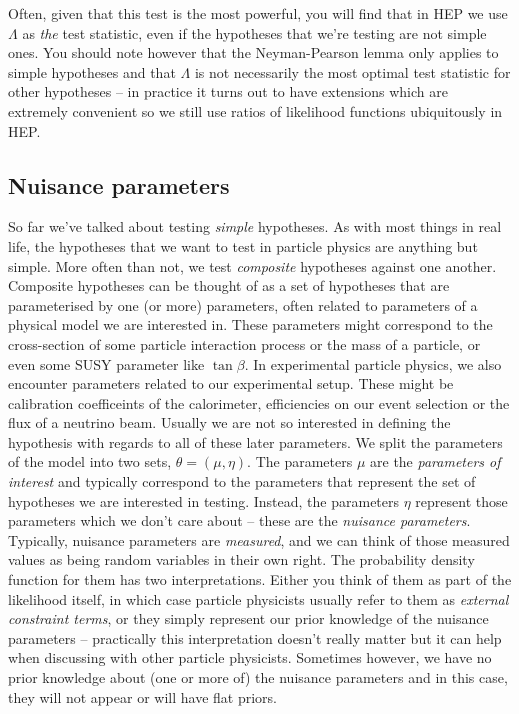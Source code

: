 Often, given that this test is the most powerful, you will find that in HEP we use $\Lambda$ as \emph{the} test statistic, even if the hypotheses that we're testing are not simple ones. You should note however that the Neyman-Pearson lemma only applies to simple hypotheses and that $\Lambda$ is not necessarily the most optimal test statistic for other hypotheses -- in practice it turns out to have extensions which are extremely convenient so we still use ratios of likelihood functions ubiquitously in HEP. 


\subsection{Nuisance parameters}
So far we've talked about testing \emph{simple} hypotheses. As with most things in real life, the hypotheses that we want to test in particle physics are anything but simple. More often than not, we test \emph{composite} hypotheses against one another. Composite hypotheses can be thought of as a set of hypotheses that are parameterised by one (or more) parameters, often related to parameters of a physical model we are interested in. These parameters might correspond to the cross-section of some particle interaction process or the mass of a particle, or even some SUSY parameter like $\tan\beta$. In experimental particle physics, we also encounter parameters related to our experimental setup. These might be calibration coefficeints of the calorimeter, efficiencies on our event selection or the flux of a neutrino beam. Usually we are not so interested in defining the hypothesis with regards to all of these later parameters. We split the parameters of the model into two sets, $\theta=(\mu,\eta)$. The parameters $\mu$ are the \emph{parameters of interest} and typically correspond to the parameters that represent the set of hypotheses we are interested in testing. Instead, the parameters $\eta$ represent those parameters which we don't care about -- these are the \emph{nuisance parameters}. Typically, nuisance parameters are \emph{measured}, and we can think of those measured values as being random variables in their own right. The probability density function for them has two interpretations. Either you think of them as part of the likelihood itself, in which case particle physicists usually refer to them as \emph{external constraint terms}, or they simply represent our prior knowledge of the nuisance parameters -- practically this interpretation doesn't really matter but it can help when discussing with other particle physicists. Sometimes however, we have no prior knowledge about (one or more of) the nuisance parameters and in this case, they will not appear or will have flat priors.

